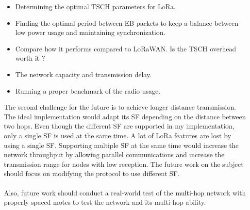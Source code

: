 \documentclass[11pt]{report}
\begin{document}
\begin{itemize}
  \item Determining the optimal TSCH parameters for LoRa.
  \item Finding the optimal period between EB packets to keep a balance between
    low power usage and maintaining synchronization.
  \item Compare how it performs compared to LoRaWAN. Is the TSCH overhead
    worth it ?
  \item The network capacity and transmission delay.
  \item Running a proper benchmark of the radio usage.
\end{itemize}

The second challenge for the future is to achieve longer distance transmission.
The ideal implementation would adapt its SF depending on the distance between two hops.
Even though the different SF are supported in my implementation, only a single SF is used at the same time.
A lot of LoRa features are lost by using a single SF.
Supporting multiple SF at the same time would increase the network throughput by
allowing parallel communications and increase the transmission range for nodes
with low reception.
The future work on the subject should focus on modifying the protocol to use
different SF.

\paragraph{}

Also, future work should conduct a real-world test of the multi-hop network
with properly spaced motes to test the network and its multi-hop ability.

\newpage

\printbibliography

\newpage

\begin{appendices}

\end{appendices}
\end{document}
